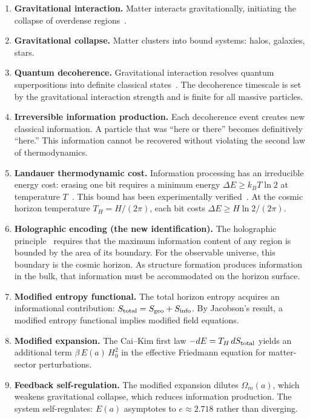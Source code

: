 \documentclass[twocolumn,a4paper,aps,prd,twocolumn,showpacs,notitlepage,superscriptaddress,nofootinbib]{article}
\newcommand{\Ea}{E(a)}
\begin{document}
\begin{enumerate}[leftmargin=2em]
  \item \textbf{Gravitational interaction.}  Matter interacts gravitationally,
    initiating the collapse of overdense regions~\citep{Peebles1980}.
  \item \textbf{Gravitational collapse.}  Matter clusters into bound
    systems: halos, galaxies, stars.
  \item \textbf{Quantum decoherence.}  Gravitational interaction resolves
    quantum superpositions into definite classical states~\citep{Zurek2003}.
    The decoherence timescale is set by the gravitational interaction strength
    and is finite for all massive particles.
  \item \textbf{Irreversible information production.}  Each decoherence event
    creates new classical information.  A particle that was ``here or there''
    becomes definitively ``here.''  This information cannot be recovered without
    violating the second law of thermodynamics.
  \item \textbf{Landauer thermodynamic cost.}  Information processing has an
    irreducible energy cost: erasing one bit requires a minimum energy
    $\Delta E \geq k_B T \ln 2$ at temperature $T$~\citep{Landauer1961}.  This
    bound has been experimentally verified~\citep{Berut2012,Jun2014}.  At the
    cosmic horizon temperature $T_H = H/(2\pi)$, each bit costs
    $\Delta E \geq H \ln 2 / (2\pi)$.
  \item \textbf{Holographic encoding (the new identification).}  The
    holographic principle~\citep{tHooft1993,Susskind1995} requires that the
    maximum information content of any region is bounded by the area of its
    boundary.  For the observable universe, this boundary is the cosmic
    horizon.  As structure formation produces information in the bulk, that
    information must be accommodated on the horizon surface.
  \item \textbf{Modified entropy functional.}  The total horizon entropy
    acquires an informational contribution:
    $S_{\rm total} = S_{\rm geo} + S_{\rm info}$.
    By Jacobson's result, a modified entropy functional implies modified field
    equations.
  \item \textbf{Modified expansion.}  The Cai--Kim first law
    $-dE = T_H\,dS_{\rm total}$ yields an additional term
    $\beta\,\Ea\,H_0^2$ in the effective Friedmann equation for matter-sector
    perturbations.
  \item \textbf{Feedback self-regulation.}  The modified expansion dilutes
    $\Omega_m(a)$, which weakens gravitational collapse, which reduces
    information production.  The system self-regulates: $E(a)$ asymptotes to
    $e \approx 2.718$ rather than diverging.
\end{enumerate}
\end{document}
